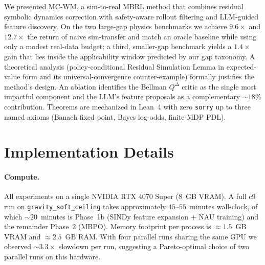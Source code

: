 \documentclass{article}
\theoremstyle{definition}
\newcommand{\QD}{Q^{\Delta}}
\begin{document}
We presented MC-WM, a sim-to-real MBRL method that combines residual
symbolic dynamics correction with safety-aware rollout filtering and
LLM-guided feature discovery.  On the two large-gap physics benchmarks
we achieve $9.6\times$ and $12.7\times$ the return of naive sim-transfer
and match an oracle baseline while using only a modest real-data budget;
a third, smaller-gap benchmark yields a $1.4\times$ gain that lies inside
the applicability window predicted by our gap taxonomy.  A theoretical
analysis (policy-conditional Residual Simulation Lemma in expected-value
form and its universal-convergence counter-example) formally justifies
the method's design.  An ablation identifies the Bellman $\QD$ critic as
the single most impactful component and the LLM's feature proposals as
a complementary $\sim 18\%$ contribution.  Theorems are mechanized in
Lean~4 with zero \texttt{sorry} up to three named axioms (Banach fixed
point, Bayes log-odds, finite-MDP PDL).




\appendix

\section{Implementation Details}
\label{app:impl}

\paragraph{Compute.}  All experiments on a single NVIDIA RTX 4070 Super
($8$~GB VRAM).  A full c9 run on \texttt{gravity\_soft\_ceiling}
takes approximately $45$--$55$~minutes wall-clock, of which
$\sim 20$~minutes is Phase~1b (SINDy feature expansion + NAU training)
and the remainder Phase~2 (MBPO).  Memory footprint per process is
$\approx 1.5$~GB VRAM and $\approx 2.5$~GB RAM.  With four parallel runs
sharing the same GPU we observed $\sim 3.3\times$ slowdown per run,
suggesting a Pareto-optimal choice of two parallel runs on this
hardware.
\end{document}
